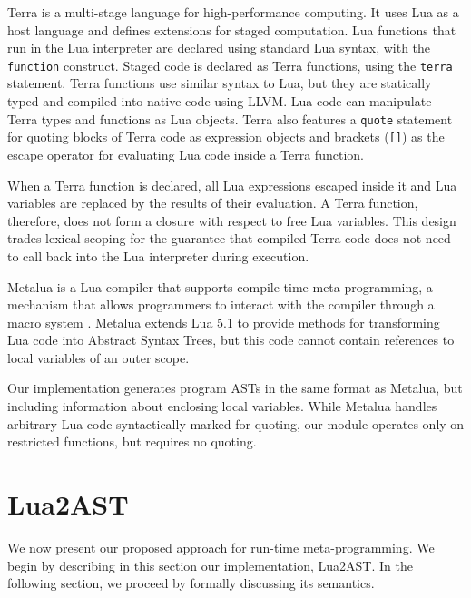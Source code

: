 \documentclass[english]{llncs}
\begin{document}
Terra \cite{DeVito2013Terra} is a multi-stage language for high-performance
computing. It uses Lua as a host language and defines extensions
for staged computation. Lua functions that run in the Lua interpreter are
declared using standard Lua syntax, with the \texttt{function} construct.
Staged code is declared as Terra functions, using the \texttt{terra}
statement. Terra functions use similar syntax to Lua, but they are statically
typed and compiled into native code using LLVM. Lua code can manipulate Terra
types and functions as Lua objects. Terra also features a \texttt{quote} statement
for quoting blocks of Terra code as expression objects and brackets
(\texttt{[]}) as the escape operator for evaluating Lua code inside a Terra
function.

When a Terra function is declared, all Lua expressions escaped inside it
and Lua variables are replaced by the results of their evaluation.
A Terra function, therefore, does not form a closure with
respect to free Lua variables. This design trades lexical scoping for the
guarantee that compiled Terra code does not need to call back into the Lua
interpreter during execution.

Metalua \cite{metalua} is a Lua compiler that supports compile-time
meta-programming, a mechanism that allows programmers to interact
with the compiler through a macro system \cite{Fleutot2007contrasting}.
Metalua extends Lua 5.1 to provide methods for transforming Lua
code into Abstract Syntax Trees, but this code cannot contain
references to local variables of an outer scope.

Our implementation generates program ASTs in the same format as
Metalua, but including information about enclosing local variables. While Metalua
handles arbitrary Lua code syntactically marked for quoting, our module
operates only on restricted functions, but requires no quoting.

\section{Lua2AST}
\label{sec:lua2ast}

We now present our proposed approach for run-time meta-programming. We begin
by describing in this section our implementation, Lua2AST. In the following
section, we proceed by formally discussing its semantics.
\end{document}
